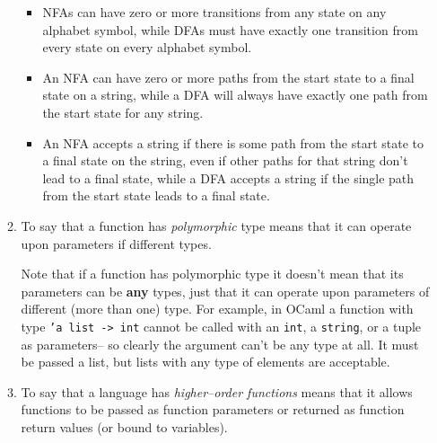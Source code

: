 \documentclass[11pt,fleqn]{article}
\begin{document}
\begin{enumerate}
\begin{enumerate}
\begin{itemize}
                    \item NFAs can have zero or more transitions from any
                          state on any alphabet symbol, while DFAs must have
                          exactly one transition from every state on every
                          alphabet symbol.

                    \item An NFA can have zero or more paths from the start
                          state to a final state on a string, while a DFA
                          will always have exactly one path from the start
                          state for any string.

                    \item An NFA accepts a string if there is some path from
                          the start state to a final state on the string,
                          even if other paths for that string don't lead to
                          a final state, while a DFA accepts a string if the
                          single path from the start state leads to a final
                          state.

                  \end{itemize}

            \item To say that a function has \emph{polymorphic} type means
                  that it can operate upon parameters if different types.

                  Note that if a function has polymorphic type it doesn't
                  mean that its parameters can be \textbf{any} types, just
                  that it can operate upon parameters of different (more
                  than one) type.  For example, in OCaml a function with
                  type \texttt{'a list -> int} cannot be called with an
                  \texttt{int}, a \texttt{string}, or a tuple as
                  parameters-- so clearly the argument can't be any type at
                  all.  It must be passed a list, but lists with any type of
                  elements are acceptable.

            \item To say that a language has \emph{higher--order functions}
                  means that it allows functions to be passed as function
                  parameters or returned as function return values (or bound
                  to variables).

          \end{enumerate}


\end{enumerate}
\end{document}
